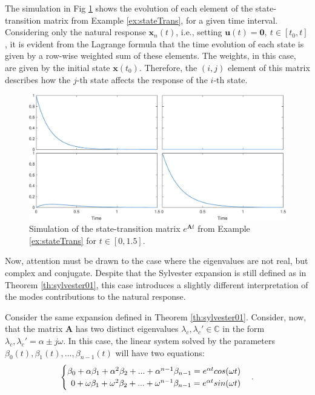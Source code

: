 \documentclass[a4paper,11pt]{book}
\numberwithin{figure}{chapter}
\numberwithin{equation}{chapter}
\numberwithin{table}{chapter}
\newtheorem{theorem}{Theorem}[chapter]
\theoremstyle{definition}
\newcounter{boxed-theorem}
\newenvironment{boxed-theorem}[1]
{\colorlet{shadecolor}{pastelBlue2!10} \begin{shaded} \begin{theorem}{#1}}
{\end{theorem} \end{shaded}}
\newcounter{boxed-definition}
\newcounter{boxed-example}
\begin{document}
The simulation in Fig \ref{fig:stateTrans01} shows the evolution of each element of the state-transition matrix from Example \ref{ex:stateTrans}, for a given time interval. Considering only the natural response $\bm{x}_n(t)$, i.e., setting $\bm{u}(t) = \bm{0},\ t \in [t_0, t]$, it is evident from the Lagrange formula that the time evolution of each state is given by a row-wise weighted sum of these elements. The weights, in this case, are given by the initial state $\bm{x}(t_0)$. Therefore, the $(i, j)$ element of this matrix describes how the $j$-th state affects the response of the $i$-th state.

\begin{figure}[ht] \centering
    \includegraphics[width=\textwidth]{chapter2/stateTrans01}
    
    \caption{Simulation of the state-transition matrix $e^{\bm{A} t}$ from Example \ref{ex:stateTrans} for $t \in [0, 1.5]$.}
    \label{fig:stateTrans01}
\end{figure}

Now, attention must be drawn to the case where the eigenvalues are not real, but complex and conjugate. Despite that the Sylvester expansion is still defined as in Theorem \ref{th:sylvester01}, this case introduces a slightly different interpretation of the modes contributions to the natural response.

\begin{boxed-theorem}{} \label{th:sylvester02}
    Consider the same expansion defined in Theorem \ref{th:sylvester01}. Consider, now, that the matrix $\bm{A}$ has two distinct eigenvalues $\lambda_c, \lambda_c' \in \mathbb{C}$ in the form $\lambda_c, \lambda_c' = \alpha \pm j \omega$. In this case, the linear system solved by the parameters $\beta_0(t), \beta_1(t), ..., \beta_{n-1}(t)$ will have two equations:
    \begin{align} \label{eq:sylvEq01}
    \begin{cases}
        \beta_0 + \alpha \beta_1 + \alpha^{2} \beta_2 + ... + \alpha^{n-1} \beta_{n-1} = e^{\alpha t} cos(\omega t) & \\
        \hfill 0 + \omega \beta_1 + \omega^{2} \beta_2 + ... + \omega^{n-1} \beta_{n-1} = e^{\alpha t} sin(\omega t) &
    \end{cases}
    .\end{align}
\end{boxed-theorem}
\end{document}
